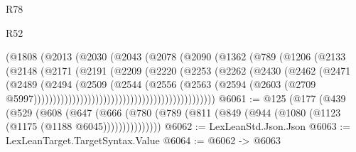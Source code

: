 \begin{lexlean}{R78}
\begin{lexlean}{R52}
\begin{coremodule}
{{{{{{{{{{{{{{{{{{{{{{{{{{{{{{{{{{{{{{{{{{{{{{{{{{{{{{{{{{{{{{{{{{{{{{{{{{{{{{{{{{{{{{{{{{{{{{{{{{{{{{{{{{{{{{{{{{{{{{{{{{{{{{{{{{{{{{{{{{{{{{{{{{{{{{{{{{{{{{{{{{{{{{{{{{{{{{{{{{{{{{{{{{{{{{{{{{{{{{                                        (@1808
                                          (@2013
                                            (@2030
                                              (@2043
                                                (@2078
                                                  (@2090
                                                    (@1362
                                                      (@789
                                                        (@1206
                                                          (@2133
                                                            (@2148
                                                              (@2171
                                                                (@2191
                                                                  (@2209
                                                                    (@2220
                                                                      (@2253
                                                                        (@2262
                                                                          (@2430
                                                                            (@2462
                                                                              (@2471
                                                                                (@2489
                                                                                  (@2494
                                                                                    (@2509
                                                                                      (@2544
                                                                                        (@2556
                                                                                          (@2563
                                                                                            (@2594
                                                                                              (@2603
                                                                                                (@2709
                                                                                                  @5997)))))))))))))))))))))))))))))))))))))))))))))))
@6061 := @125
    (@177
      (@439
        (@529
          (@608
            (@647
              (@666 (@780 (@789 (@811 (@849 (@944 (@1080 (@1123 (@1175 (@1188 @6045)))))))))))))))
@6062 := LexLeanStd.Json.Json
@6063 := LexLeanTarget.TargetSyntax.Value
@6064 := @6062 -> @6063
}}}}}}}}}}}}}}}}}}}}}}}}}}}}}}}}}}}}}}}}}}}}}}}}}}}}}}}}}}}}}}}}}}}}}}}}}}}}}}}}}}}}}}}}}}}}}}}}}}}}}}}}}}}}}}}}}}}}}}}}}}}}}}}}}}}}}}}}}}}}}}}}}}}}}}}}}}}}}}}}}}}}}}}}}}}}}}}}}}}}}}}}}}}}}}}}}}}}}}
\end{coremodule}
\end{lexlean}
\end{lexlean}

